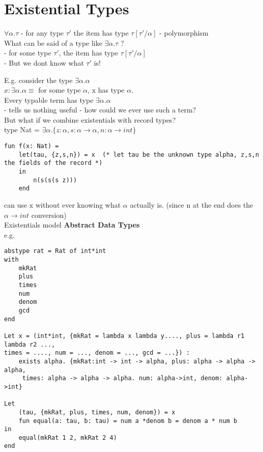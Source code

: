 \documentclass[11pt]{article}
\begin{document}
\section{Existential Types}

$\forall \alpha. \tau$ - for any type $\tau'$ the item has type $\tau[\tau'/\alpha]$ - polymorphism \\

What can be said of a type like $\exists \alpha. \tau$ ? \\

- for some type $\tau'$, the item has type $\tau[\tau'/\alpha]$ \\

- But we dont know what $\tau'$ is!

E.g. consider the type $\exists \alpha.\alpha$ \\

$x:\exists \alpha.\alpha \equiv $ for some type $\alpha$, x has type $\alpha$. \\

Every typable term has type $\exists \alpha.\alpha$ \\

- tells us nothing useful - how could we ever use such a term? \\

But what if we combine existentials with record types? \\

type Nat = $\exists \alpha. \{z:\alpha, s:\alpha \rightarrow \alpha, n:\alpha \rightarrow int\}$ \\

\begin{verbatim}
fun f(x: Nat) =
	let(tau, {z,s,n}) = x  (* let tau be the unknown type alpha, z,s,n the fields of the record *)
	in
		n(s(s(s z)))
	end
\end{verbatim}

can use x without ever knowing what $\alpha$ actually is. (since n at the end does the $\alpha \rightarrow int$ conversion)\\

Existentials model {\bf Abstract Data Types} \\

e.g.
\begin{verbatim}
abstype rat = Rat of int*int
with
	mkRat
	plus
	times
	num
	denom
	gcd
end

Let x = (int*int, {mkRat = lambda x lambda y...., plus = lambda r1 lambda r2 ..., 
times = ...., num = ..., denom = ..., gcd = ...}) :
	exists alpha. {mkRat:int -> int -> alpha, plus: alpha -> alpha -> alpha,
	 times: alpha -> alpha -> alpha. num: alpha->int, denom: alpha->int}

Let
	(tau, {mkRat, plus, times, num, denom}) = x
	fun equal(a: tau, b: tau) = num a *denom b = denom a * num b
in
	equal(mkRat 1 2, mkRat 2 4)
end
\end{verbatim}
\end{document}
